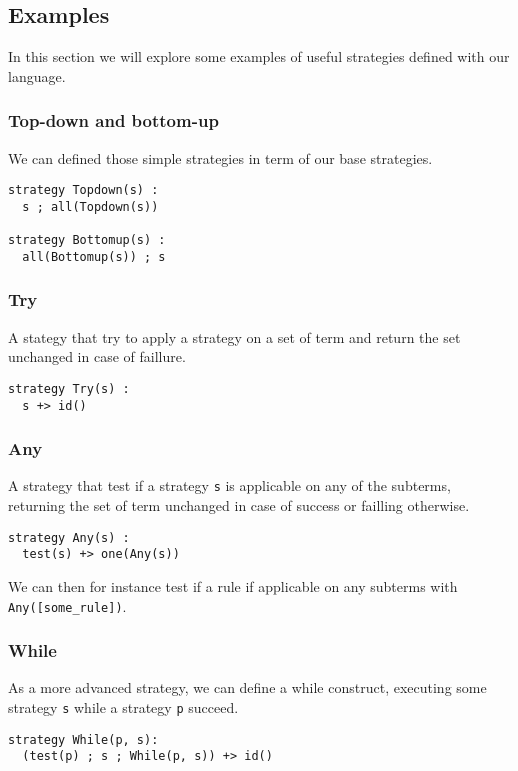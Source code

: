 \documentclass[12pt,a4paper]{article}
\begin{document}
\subsection{Examples}
In this section we will explore some examples of useful strategies defined with our
language.

\subsubsection*{Top-down and bottom-up}
We can defined those simple strategies in term of our base strategies.

\begin{verbatim}
strategy Topdown(s) :
  s ; all(Topdown(s))

strategy Bottomup(s) :
  all(Bottomup(s)) ; s
\end{verbatim}

\subsubsection*{Try}
A stategy that try to apply a strategy on a set of term and return the set unchanged
in case of faillure.

\begin{verbatim}
strategy Try(s) :
  s +> id() 
\end{verbatim}


\subsubsection*{Any}
A strategy that test if a strategy \verb|s| is applicable on any of the subterms,
returning the set of term unchanged in case of success or failling otherwise.

\begin{verbatim}
strategy Any(s) :
  test(s) +> one(Any(s))
\end{verbatim}

We can then for instance test if a rule if applicable on any subterms with
\verb|Any([some_rule])|.

\subsubsection*{While}
As a more advanced strategy, we can define a while construct, executing some strategy \verb|s| while a strategy \verb|p| succeed.

\begin{verbatim}
strategy While(p, s):
  (test(p) ; s ; While(p, s)) +> id()
\end{verbatim}
\end{document}
